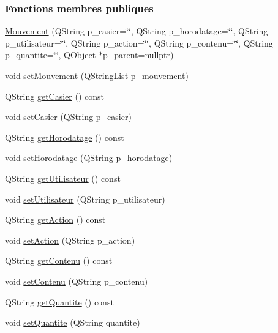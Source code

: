 \subsubsection*{Fonctions membres publiques}
\begin{DoxyCompactItemize}
\item 
\hyperlink{class_mouvement_a18a2064ccc33ffefd5b56c7ba2630c8b}{Mouvement} (Q\+String p\+\_\+casier=\char`\"{}\char`\"{}, Q\+String p\+\_\+horodatage=\char`\"{}\char`\"{}, Q\+String p\+\_\+utilisateur=\char`\"{}\char`\"{}, Q\+String p\+\_\+action=\char`\"{}\char`\"{}, Q\+String p\+\_\+contenu=\char`\"{}\char`\"{}, Q\+String p\+\_\+quantite=\char`\"{}\char`\"{}, Q\+Object $\ast$p\+\_\+parent=nullptr)
\item 
void \hyperlink{class_mouvement_a5c7f0e876b2292627e9d1bef12de03a3}{set\+Mouvement} (Q\+String\+List p\+\_\+mouvement)
\item 
Q\+String \hyperlink{class_mouvement_ae3ebc2911605104452a612aaf8a48e64}{get\+Casier} () const
\item 
void \hyperlink{class_mouvement_ad47317b7671e3b9b7e6e060f667924a7}{set\+Casier} (Q\+String p\+\_\+casier)
\item 
Q\+String \hyperlink{class_mouvement_ab6990fd5ea6c47ab3fb6a8a4944c2df9}{get\+Horodatage} () const
\item 
void \hyperlink{class_mouvement_ab0bd90180d06f2ed37fb2b796f31aeb8}{set\+Horodatage} (Q\+String p\+\_\+horodatage)
\item 
Q\+String \hyperlink{class_mouvement_a80c65d0cba3e7918f7112fd7f85a1471}{get\+Utilisateur} () const
\item 
void \hyperlink{class_mouvement_abd38b265d54e55a4dd897e3270141a84}{set\+Utilisateur} (Q\+String p\+\_\+utilisateur)
\item 
Q\+String \hyperlink{class_mouvement_a683576b69fc9ab0bef8b85b1468408e2}{get\+Action} () const
\item 
void \hyperlink{class_mouvement_a2c64d36ea78ea6b428ddd0a0610411c1}{set\+Action} (Q\+String p\+\_\+action)
\item 
Q\+String \hyperlink{class_mouvement_a6a288ea183789e4b99f6f520ff7a32ab}{get\+Contenu} () const
\item 
void \hyperlink{class_mouvement_a07e3d77c7d7af6a74e3ac5e7eb195ff9}{set\+Contenu} (Q\+String p\+\_\+contenu)
\item 
Q\+String \hyperlink{class_mouvement_a427e1320936bfaf09ca0b2c42ae9dd98}{get\+Quantite} () const
\item 
void \hyperlink{class_mouvement_aa9ed36b12cb4c46f851682d630cc28f8}{set\+Quantite} (Q\+String quantite)
\end{DoxyCompactItemize}
